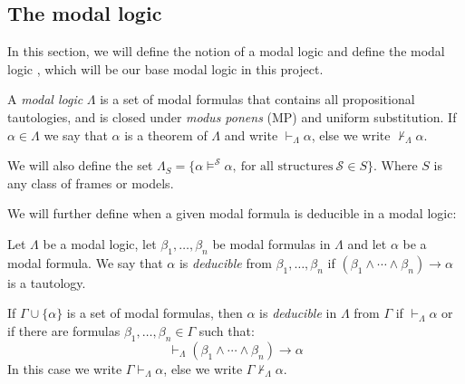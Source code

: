 \documentclass[../main.tex]{subfiles}
\begin{document}
\subsection{The modal logic \GL}
In this section, we will define the notion of a modal logic and define the modal
logic \GL, which will be our base modal logic in this project.
\begin{defi}
	A \textit{modal logic} $\Lambda$ is a set of modal formulas that contains all
	propositional tautologies, and is closed under \textit{modus ponens}
	(MP) and uniform substitution. If $\alpha\in\Lambda$ we say that
	$\alpha$ is a theorem of $\Lambda$ and write $\vdash_\Lambda\alpha$,
	else we write $\not\vdash_\Lambda\alpha$.

	We will also define the set
	$\Lambda_S=\{\alpha\vDash^\mathcal{S}\alpha,\ \text{for all structures}\
	\mathcal{S}\in S\}$. Where $S$ is any class of frames or models.
\end{defi}
We will further define when a given modal formula is deducible in a modal
logic:
\begin{defi}
	Let $\Lambda$ be a modal logic, let $\beta_1,\ldots,\beta_n$
	be modal formulas in $\Lambda$ and let $\alpha$ be a modal formula. We say that
	$\alpha$ is \textit{deducible} from $\beta_1,\ldots,\beta_n$ if
	$(\beta_1\wedge\cdots\wedge\beta_n)\rightarrow\alpha$ is a tautology.

	If $\Gamma\cup\{\alpha\}$ is a set of modal formulas, then $\alpha$ is
	\textit{deducible} in $\Lambda$ from $\Gamma$ if $\vdash_\Lambda\alpha$ or if
	there are formulas $\beta_1,\ldots,\beta_n\in\Gamma$ such that:
	\[\vdash_\Lambda(\beta_1\wedge\cdots\wedge\beta_n)\rightarrow\alpha\]
	In this case we write $\Gamma\vdash_\Lambda\alpha$, else we write
	$\Gamma\not\vdash_\Lambda\alpha$.
\end{defi}
\end{document}
